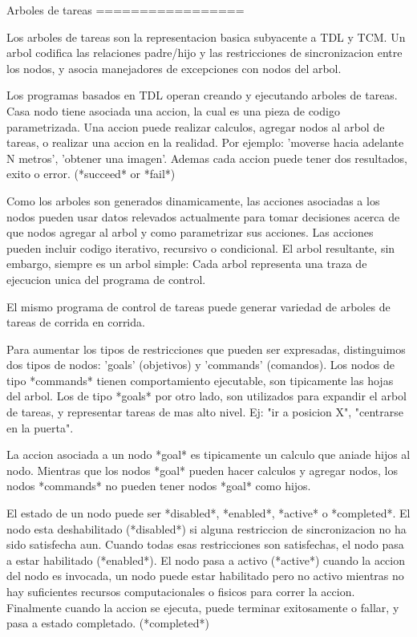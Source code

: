 Arboles de tareas
=================

Los arboles de tareas son la representacion basica subyacente a TDL y TCM. Un arbol codifica las relaciones padre/hijo y
las restricciones de sincronizacion entre los nodos, y asocia manejadores de excepciones con nodos del arbol.

Los programas basados en TDL operan creando y ejecutando arboles de tareas. 
Casa nodo tiene asociada una accion, la cual es una pieza de codigo parametrizada.
Una accion puede realizar calculos, agregar nodos al arbol de tareas, o realizar una accion en la realidad. Por
ejemplo: 'moverse hacia adelante N metros', 'obtener una imagen'. 
Ademas cada accion puede tener dos resultados, exito o error. (*succeed* or *fail*)

Como los arboles son generados dinamicamente, las acciones asociadas a los nodos pueden usar datos relevados actualmente
para tomar decisiones acerca de que nodos agregar al arbol y como parametrizar sus acciones.
Las acciones pueden incluir codigo iterativo, recursivo o condicional.
El arbol resultante, sin embargo, siempre es un arbol simple: Cada arbol representa una traza de ejecucion unica del programa de control.

El mismo programa de control de tareas puede generar variedad de arboles de tareas de corrida en corrida.

Para aumentar los tipos de restricciones que pueden ser expresadas, distinguimos dos tipos de nodos: 'goals' (objetivos) y 'commands' (comandos).
Los nodos de tipo *commands* tienen comportamiento ejecutable, son tipicamente las hojas del arbol.
Los de tipo *goals* por otro lado, son utilizados para expandir el arbol de tareas, y representar tareas de mas alto nivel. 
Ej: "ir a posicion X", "centrarse en la puerta".

La accion asociada a un nodo *goal* es tipicamente un calculo que aniade hijos al nodo. 
Mientras que los nodos *goal* pueden hacer calculos y agregar nodos, los nodos *commands* no pueden tener nodos *goal* como hijos.

El estado de un nodo puede ser *disabled*, *enabled*, *active* o *completed*.
El nodo esta deshabilitado (*disabled*) si alguna restriccion de sincronizacion no ha sido satisfecha aun.
Cuando todas esas restricciones son satisfechas, el nodo pasa a estar habilitado (*enabled*).
El nodo pasa a activo (*active*) cuando la accion del nodo es invocada, un nodo puede estar habilitado pero no activo mientras
no hay suficientes recursos computacionales o fisicos para correr la accion.
Finalmente cuando la accion se ejecuta, puede terminar exitosamente o fallar, y pasa a estado completado. (*completed*)

